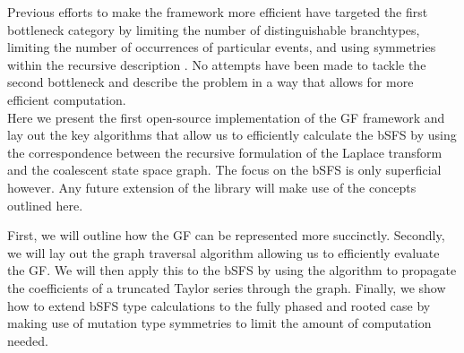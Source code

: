 \documentclass[10pt, a4]{article}
\begin{document}
Previous efforts to make the framework more efficient have targeted the first bottleneck category by limiting the number of distinguishable branchtypes, limiting the number of occurrences of particular events, and using symmetries within the recursive description \citep{Lohse2016}. No attempts have been made to tackle the second bottleneck and describe the problem in a way that allows for more efficient computation.\\

Here we present the first open-source implementation of the GF framework and lay out the key algorithms that allow us to efficiently calculate the bSFS by using the correspondence between the recursive formulation of the Laplace transform and the coalescent state space graph. The focus on the bSFS is only superficial however. Any future extension of the library will make use of the concepts outlined here.

First, we will outline how the GF can be represented more succinctly. Secondly, we will lay out the graph traversal algorithm allowing us to efficiently evaluate the GF. We will then apply this to the bSFS by using the algorithm to propagate the coefficients of a truncated Taylor series through the graph. Finally, we show how to extend bSFS type calculations to the fully phased and rooted case by making use of mutation type symmetries to limit the amount of computation needed.

\end{document}
